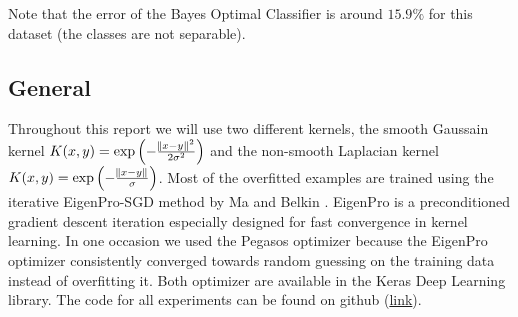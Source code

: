 Note that the error of the Bayes Optimal Classifier is around $15.9\%$ for this dataset (the classes are not separable).


\subsection{General}

Throughout this report we will use two different kernels, the smooth Gaussain kernel $K(x,y) = \exp \left( - \frac{\norm{x-y}^2}{2\sigma^2} \right)$ and the non-smooth Laplacian kernel $K(x,y) = \exp \left( - \frac{\norm{x-y}}{\sigma} \right)$. Most of the overfitted examples are trained using the iterative EigenPro-SGD method by Ma and Belkin \cite{ma2017}. EigenPro is a preconditioned gradient descent iteration especially designed for fast convergence in kernel learning. In one occasion we used the Pegasos optimizer \cite{pegasos} because the EigenPro optimizer consistently converged towards random guessing on the training data instead of overfitting it. Both optimizer are available in the Keras Deep Learning library. The code for all experiments can be found on github (\href{https://github.com/johannespitz/kernel-overfitting}{link}).
